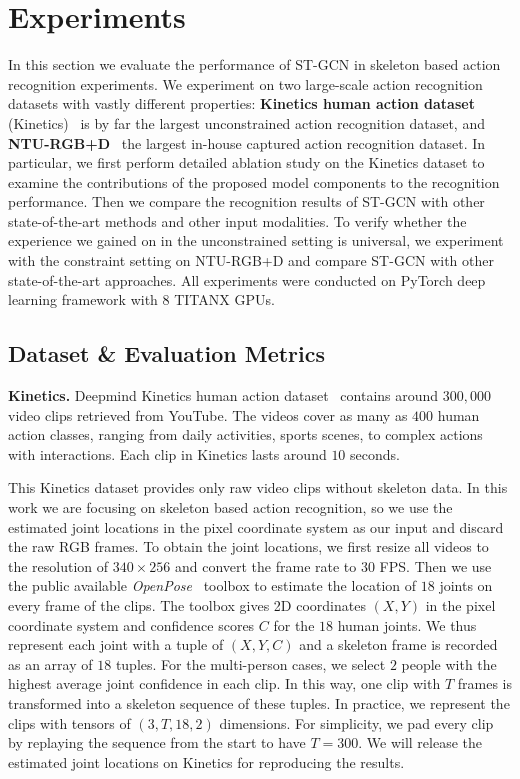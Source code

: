 \documentclass[letterpaper]{article} %
\begin{document}
\section{Experiments}

In this section we evaluate the performance of ST-GCN in skeleton based action recognition experiments.
We experiment on two large-scale action recognition datasets with vastly different properties: \textbf{Kinetics human action dataset} (Kinetics)~\cite{Kay2017Kinetics} is by far the largest unconstrained action recognition dataset, and \textbf{NTU-RGB+D}~\cite{Shahroudy2016CVPR} the largest in-house captured action recognition dataset.
In particular, we first perform detailed ablation study on the Kinetics dataset to examine the contributions of the proposed model components to the recognition performance.
Then we compare the recognition results of ST-GCN with other state-of-the-art methods and other input modalities.
To verify whether the experience we gained on in the unconstrained setting is universal, we experiment with the constraint setting on NTU-RGB+D and compare ST-GCN with other state-of-the-art approaches.
All experiments were conducted on PyTorch deep learning framework with 8 TITANX GPUs.



\subsection{Dataset \& Evaluation Metrics}
\textbf{Kinetics.}
Deepmind Kinetics human action dataset~\cite{Kay2017Kinetics} contains around $300,000$ video clips retrieved from YouTube.
The videos cover as many as $400$ human action classes, ranging from daily activities, sports scenes, to complex actions with interactions.
Each clip in Kinetics lasts around $10$ seconds.

This Kinetics dataset provides only raw video clips without skeleton data. 
In this work we are focusing on skeleton based action recognition, so we use the estimated joint locations in the pixel coordinate system as our input and discard the raw RGB frames.
To obtain the joint locations, we first resize all videos to the resolution of $340 \times 256$ and convert the frame rate to $30$ FPS. Then we use the public available \emph{OpenPose}~\cite{Cao2017Openpose} toolbox to estimate the location of $ 18 $ joints on every frame of the clips.
The toolbox gives 2D coordinates $(X, Y)$ in the pixel coordinate system and confidence scores $C$ for the $18$ human joints.
We thus represent each joint with a tuple of $(X, Y, C)$ and a skeleton frame is recorded as an array of $ 18 $ tuples.
For the multi-person cases, we select $2$ people with the highest average joint confidence in each clip.
In this way, one clip with $ T $ frames is transformed into a skeleton sequence of these tuples.
In practice, we represent the clips with tensors of $ (3, T, 18, 2) $ dimensions.
For simplicity, we pad every clip by replaying the sequence from the start to have $ T=300 $.
We will release the estimated joint locations on Kinetics for reproducing the results.
\end{document}
